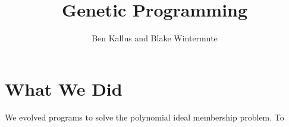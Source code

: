 \documentclass[12pt]{article}
\title{Genetic Programming}
\author{Ben Kallus and Blake Wintermute}
\date{ }
\begin{document}
\pagecolor{black}
\color{white}
\maketitle

\section*{What We Did}

    We evolved programs to solve the polynomial ideal membership problem. To 
\end{document}
